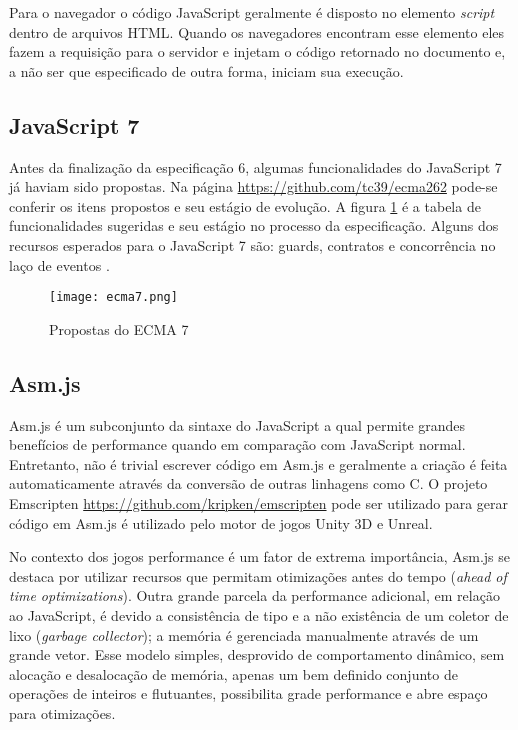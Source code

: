 Para o navegador o código JavaScript geralmente é disposto no elemento
\textit{script} dentro de arquivos HTML. Quando os navegadores encontram esse
elemento eles fazem a requisição para o servidor e injetam o código
retornado no documento e, a não ser que especificado de outra forma,
iniciam sua execução.

\subsection{JavaScript 7}

Antes da finalização da especificação 6, algumas funcionalidades
do JavaScript 7 já haviam sido propostas. Na página
\url{https://github.com/tc39/ecma262} pode-se conferir os itens
propostos e seu estágio de evolução. A figura \ref{fig:ecma7} é
a tabela de funcionalidades sugeridas e seu estágio no processo da
especificação. Alguns dos recursos esperados para o JavaScript 7 são:
guards, contratos e concorrência no laço de eventos \autocite{ecma7}.

\begin{figure}[H]
    \centering
    \texttt{[image: ecma7.png]}
	\caption{Propostas do ECMA 7}
    \label{fig:ecma7}
\end{figure}

\subsection{Asm.js}

Asm.js é um subconjunto da sintaxe do JavaScript a qual permite
grandes benefícios de performance quando em comparação com
JavaScript normal. Entretanto, não é trivial escrever código em
Asm.js e geralmente a criação é feita automaticamente através
da conversão de outras linhagens como C. O projeto Emscripten
\url{https://github.com/kripken/emscripten} pode ser utilizado para gerar
código em Asm.js é utilizado pelo motor de jogos Unity 3D e Unreal.

No contexto dos jogos performance é um fator de extrema importância,
Asm.js se destaca por utilizar recursos que permitam otimizações
antes do tempo (\textit{ahead of time optimizations}). Outra grande
parcela da performance adicional, em relação ao JavaScript, é
devido a consistência de tipo e a não existência de um coletor de
lixo (\textit{garbage collector}); a memória é gerenciada manualmente
através de um grande vetor. Esse modelo simples, desprovido de
comportamento dinâmico, sem alocação e desalocação de memória,
apenas um bem definido conjunto de operações de inteiros e flutuantes,
possibilita grade performance e abre espaço para otimizações.

